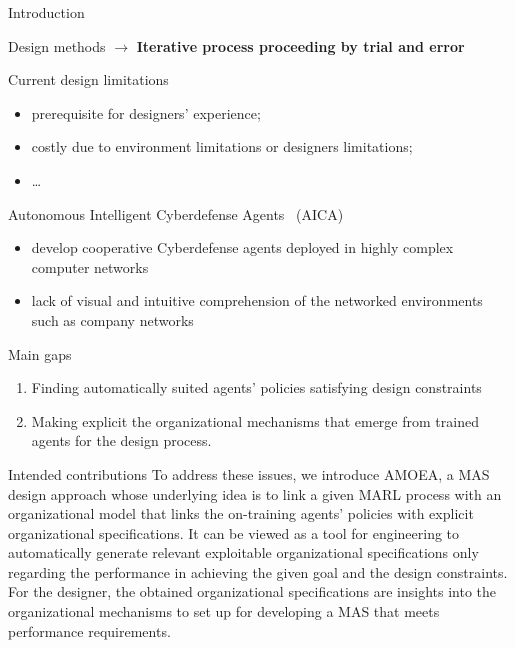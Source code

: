 \begin{frame}[allowframebreaks]{Introduction}
\begin{block}{Design methods}
        \quad $\rightarrow$ \textbf{Iterative process proceeding by trial and error}

    \end{block}

    \begin{alertblock}{Current design limitations}
        \begin{itemize}
            \item prerequisite for designers' experience;
            \item costly due to environment limitations or designers limitations;
            \item \dots
        \end{itemize}
    \end{alertblock}

    \begin{exampleblock}{Autonomous Intelligent Cyberdefense Agents~\cite{Kott2023} (AICA)}
        \begin{itemize}
            \item develop cooperative Cyberdefense agents deployed in highly complex computer networks
            \item lack of visual and intuitive comprehension of the networked environments such as company networks
        \end{itemize}
    \end{exampleblock}

    \begin{alertblock}{Main gaps}
        \begin{enumerate}
            \item Finding automatically suited agents' policies satisfying design constraints
            \item Making explicit the organizational mechanisms that emerge from trained agents for the design process.
        \end{enumerate}
    \end{alertblock}

    \begin{alertblock}{Intended contributions}
        To address these issues, we introduce AMOEA, a MAS design approach whose underlying idea is to link a given MARL process with an organizational model that links the on-training agents' policies with explicit organizational specifications. It can be viewed as a tool for engineering to automatically generate relevant exploitable organizational specifications only regarding the performance in achieving the given goal and the design constraints. For the designer, the obtained organizational specifications are insights into the organizational mechanisms to set up for developing a MAS that meets performance requirements.
    \end{alertblock}


\end{frame}